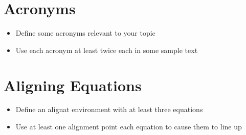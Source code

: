 \documentclass[11pt,a4paper]{article}
\begin{document}
\section{Acronyms}
\begin{itemize}
\item Define some acronyms relevant to your topic
\item Use each acronym at least twice each in some sample text
\end{itemize}

\section{Aligning Equations}
\begin{itemize}
\item Define an alignat environment with at least three equations
\item Use at least one alignment point each equation to cause them to line up
\end{itemize}
\end{document}
